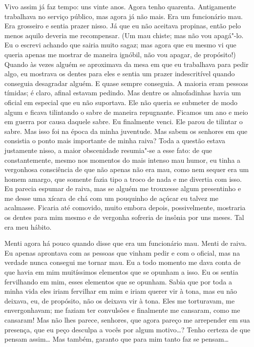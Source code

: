 Vivo assim já faz tempo: uns vinte anos. Agora tenho quarenta.
Antigamente trabalhava no serviço público, mas agora já não mais. Era
um funcionário mau. Era grosseiro e sentia prazer nisso. Já que eu não
aceitava propinas, então pelo menos aquilo deveria me recompensar. (Um
mau chiste; mas não vou apagá"-lo. Eu o escrevi achando que sairia muito
sagaz; mas agora que eu mesmo vi que queria apenas me mostrar de
maneira ignóbil, não vou apagar, de propósito!) Quando às vezes alguém
se aproximava da mesa em que eu trabalhava para pedir algo, eu mostrava
os dentes para eles e sentia um prazer indescritível quando conseguia
desagradar alguém. E quase sempre conseguia. A maioria eram pessoas
tímidas; é claro, afinal estavam pedindo. Mas dentre os almofadinhas
havia um oficial em especial que eu não suportava. Ele não queria se
submeter de modo algum e ficava tilintando o sabre de maneira
repugnante. Ficamos um ano e meio em guerra por causa daquele sabre. Eu
finalmente venci. Ele parou de tilintar o sabre. Mas isso foi na época
da minha juventude. Mas sabem os senhores em que consistia o ponto mais
importante de minha raiva? Toda a questão estava justamente nisso, a
maior obscenidade resumia"-se a esse fato: de que constantemente, mesmo
nos momentos do mais intenso mau humor, eu tinha a vergonhosa
consciência de que não apenas não era mau, como nem sequer era um homem
amargo, que somente fazia tipo a troco de nada e me divertia com isso.
Eu parecia espumar de raiva, mas se alguém me trouxesse algum
presentinho e me desse uma xícara de chá com um pouquinho de açúcar eu
talvez me acalmasse. Ficaria até comovido, muito embora depois,
possivelmente, mostraria os dentes para mim mesmo e de vergonha
sofreria de insônia por uns meses. Tal era meu hábito.

Menti agora há pouco quando disse que era um funcionário mau. Menti de
raiva. Eu apenas aprontava com as pessoas que vinham pedir e com o
oficial, mas na verdade nunca consegui me tornar mau. Eu a todo momento
me dava conta de que havia em mim muitíssimos elementos que se opunham
a isso. Eu os sentia fervilhando em mim, esses elementos que se
opunham. Sabia que por toda a minha vida eles iriam fervilhar em mim e
iriam querer vir à tona, mas eu não deixava, eu, de propósito, não os
deixava vir à tona. Eles me torturavam, me envergonhavam; me faziam ter
convulsões e finalmente me cansaram, como me cansaram! Mas não lhes
parece, senhores, que agora pareço me arrepender em sua presença, que
eu peço desculpa a vocês por algum motivo\ldots{}? Tenho certeza de que
pensam assim\ldots{} Mas também, garanto que para mim tanto faz se pensam\ldots{}

